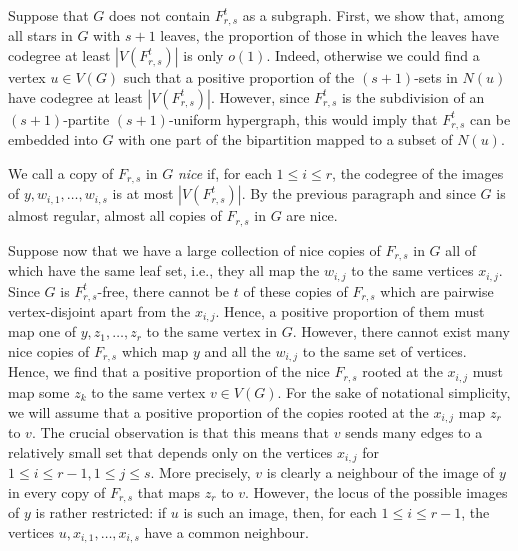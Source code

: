 Suppose that $G$ does not contain $F_{r,s}^t$ as a subgraph. First, we show that, among all stars in $G$ with $s+1$ leaves, the proportion of those in which the leaves have codegree at least $|V(F_{r,s}^t)|$ is only $o(1)$. Indeed, otherwise we could find a vertex $u\in V(G)$ such that a positive proportion of the $(s+1)$-sets  in $N(u)$ have codegree at least $|V(F_{r,s}^t)|$. However, since $F_{r,s}^t$ is the subdivision of an $(s+1)$-partite $(s+1)$-uniform hypergraph, this would imply that $F_{r,s}^t$ can be embedded into $G$ with one part of the bipartition mapped to a subset of $N(u)$.

We call a copy of $F_{r,s}$ in $G$ \emph{nice} if, for each $1\leq i\leq r$, the codegree of the images of $y,w_{i,1},\dots,w_{i,s}$ is at most $|V(F_{r,s}^t)|$. By the previous paragraph and since $G$ is almost regular, almost all copies of $F_{r,s}$ in $G$ are nice.

Suppose now that we have a large collection of nice copies of $F_{r,s}$ in $G$ all of which have the same leaf set, i.e., they all map the $w_{i,j}$ to the same vertices $x_{i,j}$. Since $G$ is $F_{r,s}^t$-free, there cannot be $t$ of these copies of $F_{r,s}$ which are pairwise vertex-disjoint apart from the $x_{i,j}$. Hence, a positive proportion of them must map one of $y,z_1,\dots,z_r$ to the same vertex in $G$. However, there cannot exist many nice copies of $F_{r,s}$ which map $y$ and all the $w_{i,j}$ to the same set of vertices. Hence, we find that a positive proportion of the nice $F_{r,s}$ rooted at the $x_{i,j}$ must map some $z_k$ to the same vertex $v\in V(G)$. For the sake of notational simplicity, we will assume that a positive proportion of the copies rooted at the $x_{i,j}$ map $z_r$ to $v$. The crucial observation is that this means that $v$ sends many edges to a relatively small set that depends only on the vertices $x_{i,j}$ for $1\leq i\leq r-1,1\leq j\leq s$. More precisely, $v$ is clearly a neighbour of the image of $y$ in every copy of $F_{r,s}$ that maps $z_r$ to $v$. However, the locus of the possible images of $y$ is rather restricted: if $u$ is such an image, then, for each $1\leq i\leq r-1$, the vertices $u,x_{i,1},\dots,x_{i,s}$ have a common neighbour.

